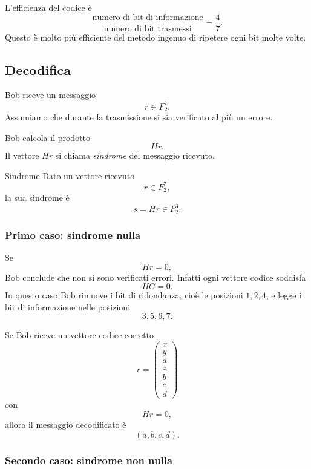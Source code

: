 \documentclass[a4paper]{article}
\begin{document}
L'efficienza del codice è
\[
    \frac{\text{numero di bit di informazione}}{\text{numero di bit trasmessi}}
    =
    \frac{4}{7}.
\]
Questo è molto più efficiente del metodo ingenuo di ripetere ogni bit molte volte.

\subsection{Decodifica}

Bob riceve un messaggio
\[
    r\in F_2^7.
\]
Assumiamo che durante la trasmissione si sia verificato al più un errore.

Bob calcola il prodotto
\[
    Hr.
\]
Il vettore \(Hr\) si chiama \emph{sindrome} del messaggio ricevuto.

\begin{snippetdefinition}{Sindrome}
    Dato un vettore ricevuto
    \[
        r\in F_2^7,
    \]
    la sua sindrome è
    \[
        s=Hr\in F_2^3.
    \]
\end{snippetdefinition}

\subsubsection{Primo caso: sindrome nulla}

Se
\[
    Hr=0,
\]
Bob conclude che non si sono verificati errori. Infatti ogni vettore codice soddisfa
\[
    HC=0.
\]
In questo caso Bob rimuove i bit di ridondanza, cioè le posizioni \(1,2,4\), e legge i bit di informazione nelle posizioni
\[
    3,5,6,7.
\]

\begin{snippetexample}{}
    Se Bob riceve un vettore codice corretto
    \[
        r=
        \begin{pmatrix}
            x\\
            y\\
            a\\
            z\\
            b\\
            c\\
            d
        \end{pmatrix}
    \]
    con
    \[
        Hr=0,
    \]
    allora il messaggio decodificato è
    \[
        (a,b,c,d).
    \]
\end{snippetexample}

\subsubsection{Secondo caso: sindrome non nulla}
\end{document}
